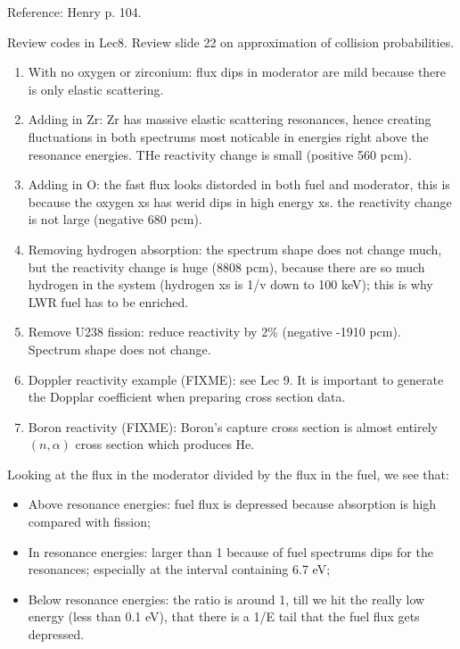 \documentclass{school-22.211-notes}
\date{March  7, 2012}
\begin{document}
\maketitle



Reference: Henry p. 104. 

Review codes in Lec8. Review slide 22 on approximation of collision probabilities. 

\begin{enumerate}
\item With no oxygen or zirconium: flux dips in moderator are mild because there is only elastic scattering. 
\item Adding in Zr: Zr has massive elastic scattering resonances, hence creating fluctuations in both spectrums most noticable in energies right above the resonance energies. THe reactivity change is small (positive 560 pcm).
\item Adding in O: the fast flux looks distorded in both fuel and moderator, this is because the oxygen xs has werid dips in high energy xs. the reactivity change is not large (negative 680 pcm). 
\item Removing hydrogen absorption: the spectrum shape does not change much, but the reactivity change is huge (8808 pcm), because there are so much hydrogen in the system (hydrogen xs is 1/v down to 100 keV); this is why LWR fuel has to be enriched. 
\item Remove U238 fission: reduce reactivity by 2\% (negative -1910 pcm). Spectrum shape does not change. 
\item Doppler reactivity example (FIXME): see Lec 9. It is important to generate the Dopplar coefficient when preparing cross section data. 
\item Boron reactivity (FIXME): Boron's capture cross section is almost entirely $(n,\alpha)$ cross section which produces He. 
\end{enumerate}

Looking at the flux in the moderator divided by the flux in the fuel, we see that:
\begin{itemize}
\item Above resonance energies: fuel flux is depressed because absorption is high compared with fission; 
\item In resonance energies: larger than 1 because of fuel spectrums dips for the resonances; especially at the interval containing 6.7 eV;
\item Below resonance energies: the ratio is around 1, till we hit the really low energy (less than 0.1 eV), that there is a 1/E tail that the fuel flux gets depressed. 
\end{itemize}
\end{document}
